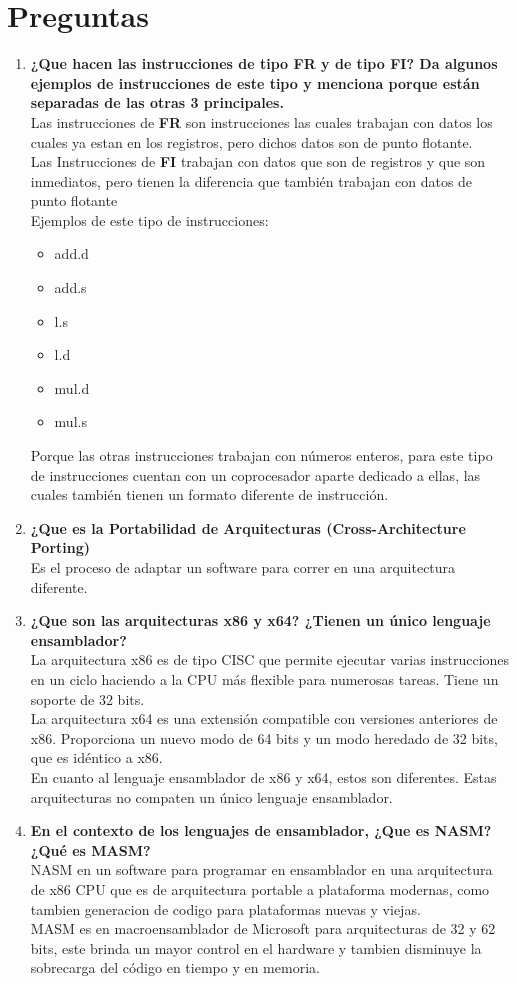 \documentclass{article}
\begin{document}
	\section*{Preguntas}
	\begin{enumerate}
    \item \textbf{¿Que hacen las instrucciones de tipo FR y de tipo FI? Da algunos ejemplos de instrucciones de este tipo y menciona porque están separadas de las otras 3 principales.\\}
	Las instrucciones de \textbf{FR} son instrucciones las cuales trabajan con datos los cuales ya estan en los registros, pero dichos datos son de punto flotante.\\
	Las Instrucciones de \textbf{FI} trabajan con datos que son de registros y que son inmediatos, pero tienen la diferencia que también trabajan con datos de punto flotante\\
	Ejemplos de este tipo de instrucciones:\\
	\begin{itemize}
		\item add.d 
		\item add.s
		\item l.s
		\item l.d
		\item mul.d
		\item mul.s
	\end{itemize}
	Porque las otras instrucciones trabajan con números enteros, para este tipo de instrucciones cuentan con un coprocesador aparte dedicado a ellas, las cuales también tienen un formato diferente de instrucción.
    \item \textbf{¿Que es la Portabilidad de Arquitecturas (Cross-Architecture Porting)\\}
		Es el proceso de adaptar un software para correr en una arquitectura diferente.
    \item \textbf{¿Que son las arquitecturas x86 y x64? ¿Tienen un único lenguaje ensamblador?\\}
		La arquitectura x86 es de tipo CISC que permite ejecutar varias instrucciones en un ciclo haciendo a la CPU más flexible para numerosas tareas. Tiene un soporte de 32 bits.\\
		La arquitectura x64 es una extensión compatible con versiones anteriores de x86. Proporciona un nuevo modo de 64 bits y un modo heredado de 32 bits, que es idéntico a x86.\\
		En cuanto al lenguaje ensamblador de x86 y x64, estos son diferentes. Estas arquitecturas no compaten un único lenguaje ensamblador.
    \item \textbf{En el contexto de los lenguajes de ensamblador, ¿Que es NASM? ¿Qué es MASM?\\}
	NASM en un software para programar en ensamblador en una arquitectura de x86 CPU que es de arquitectura portable a plataforma modernas, como tambien generacion de codigo para plataformas nuevas y viejas.\\
	MASM es en macroensamblador de Microsoft para arquitecturas de 32 y 62 bits, este brinda un mayor control en el hardware y tambien disminuye la sobrecarga del código en tiempo y en memoria.
	\end{enumerate}
	\restoregeometry
\end{document}
